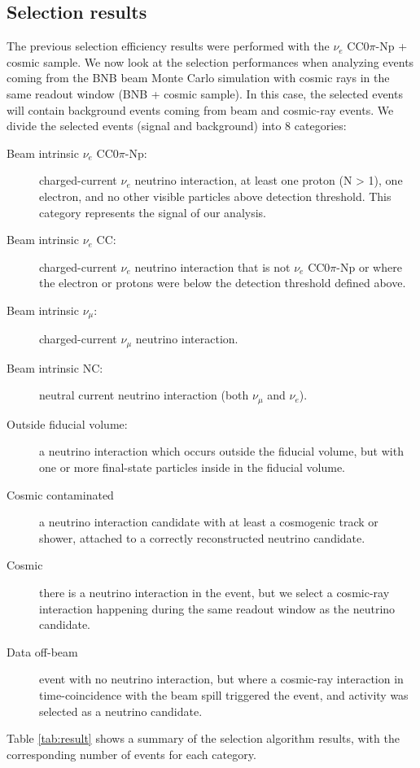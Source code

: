 \subsection{Selection results}\label{sec:numu}
The previous selection efficiency results were performed with the $\nu_{e}$ CC0$\pi$-Np + cosmic sample. We now look at the selection performances when analyzing events coming from the BNB beam Monte Carlo simulation with cosmic rays in the same readout window (BNB + cosmic sample). In this case, the selected events will contain background events coming from beam and cosmic-ray events.
We divide the selected events (signal and background) into 8 categories:
\begin{description}
\item[Beam intrinsic $\nu_{e}$ CC$0\pi$-Np:] charged-current $\nu_{e}$ neutrino interaction, at least one proton (N > 1), one electron, and no other visible particles above detection threshold. This category represents the signal of our analysis.
\item[Beam intrinsic $\nu_{e}$ CC:] charged-current $\nu_{e}$ neutrino interaction that is not $\nu_{e}$ CC$0\pi$-Np or where the electron or protons were below the detection threshold defined above.
\item[Beam intrinsic $\nu_{\mu}$:] charged-current $\nu_{\mu}$ neutrino interaction.
\item[Beam intrinsic NC:] neutral current neutrino interaction (both $\nu_{\mu}$ and $\nu_{e}$).
\item[Outside fiducial volume:] a neutrino interaction which occurs outside the fiducial volume, but with one or more final-state particles inside in the fiducial volume.
\item[Cosmic contaminated] a neutrino interaction candidate with at least a cosmogenic track or shower, attached to a correctly reconstructed neutrino candidate.
\item[Cosmic] there is a neutrino interaction in the event, but we select a cosmic-ray interaction happening during the same readout window as the neutrino candidate.
\item[Data off-beam] {event with no neutrino interaction, but where a cosmic-ray interaction in time-coincidence with the beam spill triggered the event, and activity was selected as a neutrino candidate.}

\end{description}


Table \ref{tab:result} shows a summary of the selection algorithm results, with the corresponding number of events for each category.

